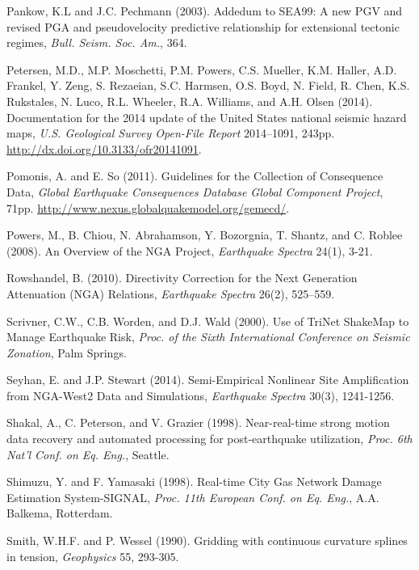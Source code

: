 \documentclass[letterpaper,10pt,english]{sphinxmanual}
\begin{document}
Pankow, K.L and J.C. Pechmann (2003). Addedum to SEA99: A new PGV and revised PGA and
pseudovelocity  predictive relationship for extensional tectonic regimes, \emph{Bull. Seism. Soc. Am.}, 364.

\label{references:petersen2014}
Petersen, M.D., M.P. Moschetti, P.M. Powers, C.S. Mueller, K.M. Haller, A.D. Frankel, Y.
Zeng, S. Rezaeian, S.C. Harmsen, O.S. Boyd, N. Field, R. Chen, K.S. Rukstales, N.
Luco, R.L. Wheeler, R.A. Williams, and A.H. Olsen (2014). Documentation for the 2014
update of the United States national seismic hazard maps, \emph{U.S. Geological Survey Open-File
Report} 2014–1091, 243pp. \url{http://dx.doi.org/10.3133/ofr20141091}.

\label{references:pomonis2011}
Pomonis, A. and E. So (2011). Guidelines for the Collection of Consequence Data, \emph{Global Earthquake
Consequences Database Global Component Project}, 71pp.
\url{http://www.nexus.globalquakemodel.org/gemecd/}.

\label{references:powers2008}
Powers, M., B. Chiou, N. Abrahamson, Y. Bozorgnia, T. Shantz, and C. Roblee (2008). An Overview of
the NGA Project, \emph{Earthquake Spectra} 24(1), 3-21.

\label{references:rowshandel2010}
Rowshandel, B. (2010). Directivity Correction for the Next Generation Attenuation (NGA)
Relations, \emph{Earthquake Spectra} 26(2), 525–559.

Scrivner, C.W., C.B. Worden, and D.J. Wald (2000). Use of TriNet ShakeMap to Manage Earthquake
Risk, \emph{Proc. of the Sixth International Conference on Seismic Zonation}, Palm Springs.

\label{references:seyhan2014}
Seyhan, E. and J.P. Stewart (2014). Semi-Empirical Nonlinear Site Amplification from NGA-West2 Data and Simulations, \emph{Earthquake
Spectra} 30(3), 1241-1256.

\label{references:shakal1998}
Shakal, A., C. Peterson, and V. Grazier (1998). Near-real-time strong motion data recovery and automated
processing for post-earthquake utilization, \emph{Proc. 6th Nat'l Conf. on Eq. Eng.}, Seattle.

Shimuzu, Y. and F. Yamasaki (1998). Real-time City Gas Network Damage Estimation System-SIGNAL,
\emph{Proc. 11th European Conf. on Eq. Eng.}, A.A. Balkema, Rotterdam.

Smith, W.H.F. and P. Wessel (1990). Gridding with continuous curvature splines in tension, \emph{Geophysics}
55, 293-305.
\end{document}
